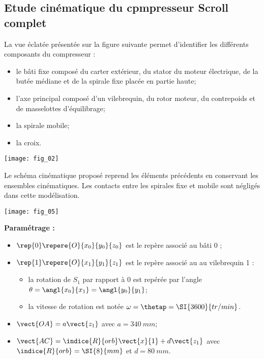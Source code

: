 \begin{multicols}{2}
\begin{multicols}{2}



\subsection*{Etude cinématique du cpmpresseur Scroll complet}


La vue éclatée présentée sur la figure suivante permet d’identifier les différents composants du compresseur :
\begin{itemize}
\item le bâti fixe composé du carter extérieur, du stator du moteur électrique, de la butée médiane et de la spirale fixe placée en partie haute;
\item l’axe principal composé d’un vilebrequin, du rotor moteur, du contrepoids et de masselottes d’équilibrage;
\item la spirale mobile;
\item la croix.
\end{itemize}

\begin{center}%
\texttt{[image: fig\_02]}
\end{center}


Le schéma cinématique proposé reprend les éléments précédents en 
conservant les ensembles cinématiques.
Les contacts entre les spirales fixe et mobile sont négligés dans cette modélisation.

\begin{center}%
\texttt{[image: fig\_05]}
\end{center}

\textbf{Paramétrage :}
\begin{itemize}
\item $\rep{0}\repere{O}{x_0}{y_0}{z_0}$ est le repère associé au bâti 0 ;
\item $\rep{1}\repere{O}{x_1}{y_1}{z_1}$ est le repère associé au au vilebrequin 1 :
\begin{itemize}
\item la rotation de $S_1$ par rapport à 0 est repérée par l’angle $\theta = \angl{x_0}{x_1} = \angl{y_0}{y_1}$;
\item la vitesse de rotation est notée $\omega=\thetap = \SI{3600}{tr/min}$.
\end{itemize}
\item $\vect{OA} = a \vect{z_1}$ avec $a=\SI{340}{mm}$;
\item $\vect{AC} =\indice{R}{orb}\vect{x}{1}+d \vect{z_1}$ avec $\indice{R}{orb}=\SI{8}{mm}$ et $d=\SI{80}{mm}$.
\end{itemize}


\end{multicols}
\end{multicols}
